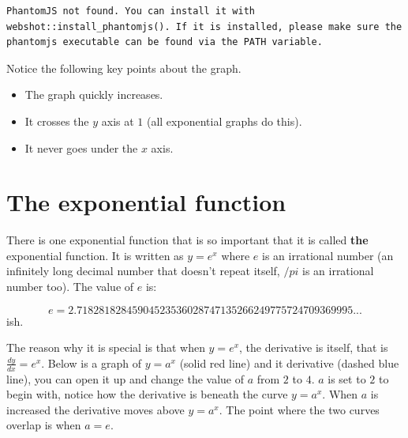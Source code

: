 \documentclass[
  a4paper,
]{scrbook}
\providecommand{\tightlist}{%
  \setlength{\itemsep}{0pt}\setlength{\parskip}{0pt}}
\begin{document}
\begin{verbatim}
PhantomJS not found. You can install it with webshot::install_phantomjs(). If it is installed, please make sure the phantomjs executable can be found via the PATH variable.
\end{verbatim}

Notice the following key points about the graph.

\begin{tcolorbox}[enhanced jigsaw, arc=.35mm, bottomrule=.15mm, bottomtitle=1mm, breakable, colback=white, colbacktitle=quarto-callout-note-color!10!white, colframe=quarto-callout-note-color-frame, coltitle=black, left=2mm, leftrule=.75mm, opacityback=0, opacitybacktitle=0.6, rightrule=.15mm, title=\textcolor{quarto-callout-note-color}{\faInfo}\hspace{0.5em}{Note}, titlerule=0mm, toprule=.15mm, toptitle=1mm]

\begin{itemize}
\tightlist
\item
  The graph quickly increases.
\item
  It crosses the \(y\) axis at \(1\) (all exponential graphs do this).
\item
  It never goes under the \(x\) axis.
\end{itemize}

\end{tcolorbox}

\section{The exponential function}\label{the-exponential-function}

There is one exponential function that is so important that it is called
\textbf{the} exponential function. It is written as \(y=e^x\) where
\(e\) is an irrational number (an infinitely long decimal number that
doesn't repeat itself, \(/pi\) is an irrational number too). The value
of \(e\) is:

\[
e = 2.71828182845904523536028747135266249775724709369995...
\] ish.

The reason why it is special is that when \(y=e^x\), the derivative is
itself, that is \(\frac{dy}{dx}=e^x\). Below is a graph of \(y=a^x\)
(solid red line) and it derivative (dashed blue line), you can open it
up and change the value of \(a\) from \(2\) to \(4\). \(a\) is set to
\(2\) to begin with, notice how the derivative is beneath the curve
\(y=a^x\). When \(a\) is increased the derivative moves above \(y=a^x\).
The point where the two curves overlap is when \(a=e\).
\end{document}
